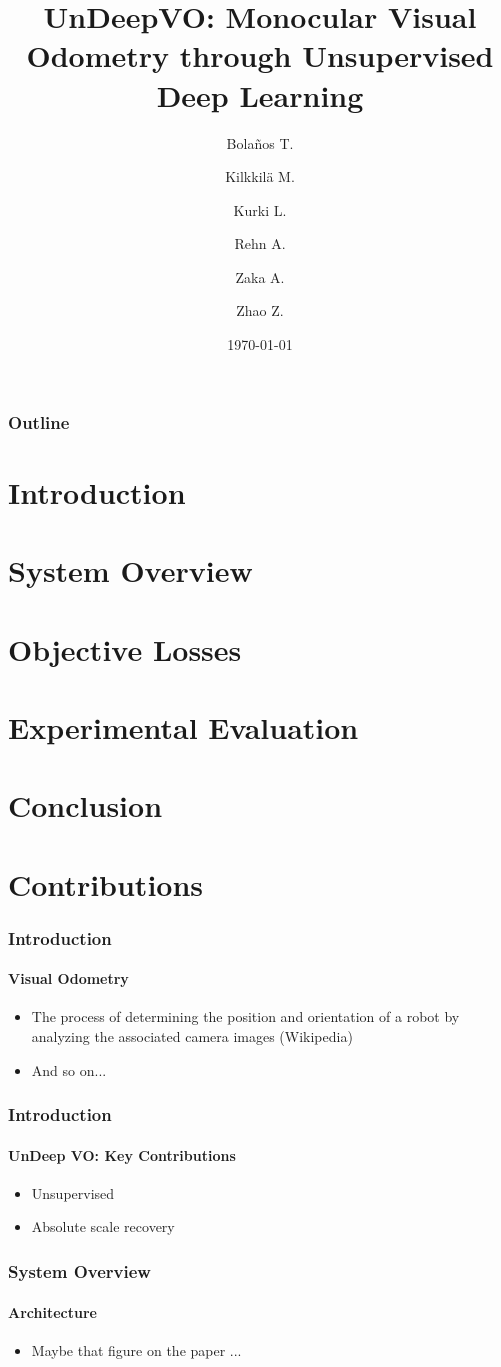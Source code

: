 \documentclass{beamer}
\title[UndeepVO]{UnDeepVO: Monocular Visual Odometry through Unsupervised Deep Learning}
\author{
    Bola\~nos T.\\
    \and
    Kilkkilä M.\\
    \and
    Kurki L.\\
    \and
    Rehn A.\\
    \and
    Zaka A.\\
    \and
    Zhao Z.
}
\date{\today}
\begin{document}
\begin{frame}
    \titlepage
\end{frame}

\begin{frame}
    \frametitle{Outline}
    \tableofcontents
\end{frame}

\section{Introduction}
\section{System Overview}
\section{Objective Losses}
\section{Experimental Evaluation}
\section{Conclusion}
\section{Contributions}

\begin{frame}
	\frametitle{Introduction}
    \framesubtitle{Visual Odometry}
    \begin{itemize}
        \item The process of determining the position and orientation of a robot by analyzing the associated camera images (Wikipedia)
        \item And so on...
    \end{itemize}
\end{frame}

\begin{frame}
	\frametitle{Introduction}
    \framesubtitle{UnDeep VO: Key Contributions}
    \begin{itemize}
        \item Unsupervised
        \item Absolute scale recovery
    \end{itemize}
\end{frame}

\begin{frame}
	\frametitle{System Overview}
    \framesubtitle{Architecture}
    \begin{itemize}
        \item Maybe that figure on the paper ...
    \end{itemize}
\end{frame}
\end{document}
